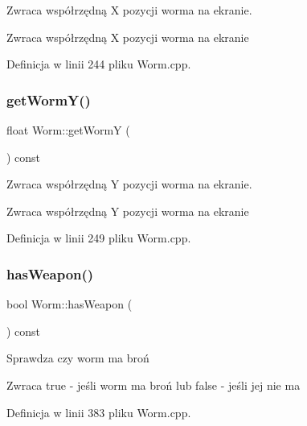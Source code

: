 Zwraca współrzędną X pozycji worma na ekranie. 

\begin{DoxyReturn}{Zwraca}
współrzędną X pozycji worma na ekranie 
\end{DoxyReturn}


Definicja w linii 244 pliku Worm.\+cpp.

\mbox{\label{class_worm_aa1a5e5334f8d3e339f15b36a9af31f27}} 
\subsubsection{\texorpdfstring{get\+Worm\+Y()}{getWormY()}}
{\footnotesize\ttfamily float Worm\+::get\+WormY (\begin{DoxyParamCaption}{ }\end{DoxyParamCaption}) const}



Zwraca współrzędną Y pozycji worma na ekranie. 

\begin{DoxyReturn}{Zwraca}
współrzędną Y pozycji worma na ekranie 
\end{DoxyReturn}


Definicja w linii 249 pliku Worm.\+cpp.

\mbox{\label{class_worm_a15fc66d733ecfe886495910f591d1a34}} 
\subsubsection{\texorpdfstring{has\+Weapon()}{hasWeapon()}}
{\footnotesize\ttfamily bool Worm\+::has\+Weapon (\begin{DoxyParamCaption}{ }\end{DoxyParamCaption}) const}



Sprawdza czy worm ma broń 

\begin{DoxyReturn}{Zwraca}
true -\/ jeśli worm ma broń lub false -\/ jeśli jej nie ma 
\end{DoxyReturn}


Definicja w linii 383 pliku Worm.\+cpp.

\mbox{\label{class_worm_a606868b7856598eef50b8ebcd2374927}} 
